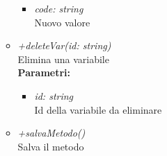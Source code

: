 \begin{itemize}
\begin{itemize}
\begin{itemize}
    			\item \emph{code: string}\\
    			Nuovo valore
    		\end{itemize}
    		\item \emph{+deleteVar(id: string)}\\
    		Elimina una variabile\\
    		\textbf{Parametri:}
    		\begin{itemize}
    			\item \emph{id: string}\\
    			Id della variabile da eliminare
    		\end{itemize}
    		\item \emph{+salvaMetodo()}\\
    		Salva il metodo
		\end{itemize}
\end{itemize}